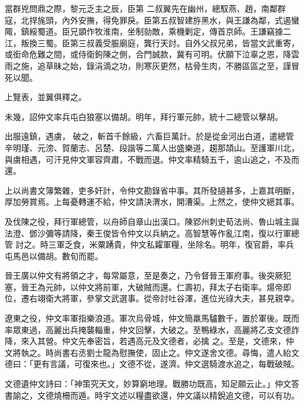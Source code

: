 \begin{pinyinscope}
 當群兇問鼎之際，黎元乏主之辰，臣第
 二叔翼先在幽州，總馭燕、趙，南鄰群寇，北捍旄頭，內外安撫，得免罪戾。臣第五叔智建斿黑水，與王謙為鄰，式遏蠻陬，鎮綏蜀道。臣兄顗作牧淮南，坐制勍敵，乘機剿定，傳首京師。王謙竊據二江，叛換三蜀。臣第三叔義受脤廟庭，龔行天討。自外父叔兄弟，皆當文武重寄，或銜命危難之間，或侍衛鉤陳之側，合門誠款，冀有可明。伏願下泣辜之恩，降雲雨之施，追草昧之始，錄涓滴之功，則寒灰更然，枯骨生肉，不勝區區之至，謹冒死以聞。



 上覽表，並翼俱釋之。



 未幾，詔仲文率兵屯白狼塞以備胡。明年，拜行軍元帥，統十二總管以擊胡。



 出服遠鎮，遇虜，
 破之，斬首千餘級，六畜巨萬計。於是從金河出白道，遣總管辛明瑾、元滂、賀蘭志、呂楚、段諧等二萬人出盛樂道，趨那頡山。至護軍川北，與虜相遇，可汗見仲文軍容齊肅，不戰而退。仲文率精騎五千，逾山追之，不及而還。



 上以尚書文簿繁雜，吏多奸計，令仲文勘錄省中事。其所發擿甚多，上嘉其明斷，厚加勞賞焉。上每憂轉運不給，仲文請決渭水，開漕渠。上然之，使仲文總其事。



 及伐陳之役，拜行軍總管，以舟師自章山出漢口。陳郢州刺史荀法尚、魯山城主誕法澄、鄧沙彌等請降，秦王俊皆令仲文以兵納之。高智慧等作亂江南，復以行軍總管
 討之。時三軍乏食，米粟踴貴，仲文私糶軍糧，坐除名。明年，復官爵，率兵屯馬邑以備胡。數旬而罷。



 晉王廣以仲文有將領之才，每常屬意，至是奏之，乃令督晉王軍府事。後突厥犯塞，晉王為元帥，以仲文將前軍，大破賊而還。仁壽初，拜太子右衛率。煬帝即位，遷右翊衛大將軍，參掌文武選事。從帝討吐谷渾，進位光祿大夫，甚見親幸。



 遼東之役，仲文率軍指樂浪道。軍次烏骨城，仲文簡羸馬驢數千，置於軍後。既而率眾東過，高麗出兵掩襲輜重，仲文回擊，大破之。至鴨綠水，高麗將乙支文德詐降，來入其營。仲文先奉密旨，若遇高元及文德者，必擒
 之。至是，文德來，仲文將執之。時尚書右丞劉士龍為慰撫使，固止之。仲文遂舍文德。尋悔，遣人紿文德曰：「更有言議，可復來也。」文德不從，遂濟。仲文選騎渡水追之，每戰破賊。



 文德遺仲文詩曰：「神策究天文，妙算窮地理。戰勝功既高，知足願云止。」仲文答書諭之，文德燒柵而遁。時宇文述以糧盡欲還，仲文議以精銳追文德，可以有功。




\end{pinyinscope}
